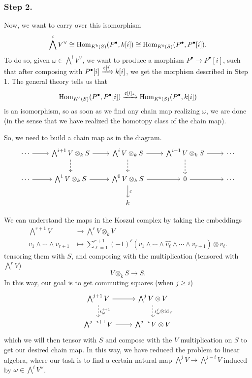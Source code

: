 \documentclass[12pt]{article}
\begin{document}
\subsubsection*{Step 2.}
Now, we want to carry over this isomorphism
\[\bigwedge^i V^\vee \cong \mathrm{Hom}_{K^b(S)}(P^\bullet, k[i]) \cong \mathrm{Hom}_{K^b(S)}(P^\bullet,P^\bullet[i]).\]
To do so, given $\omega \in \bigwedge^i V^\vee$, we want to produce a morphism $P^\bullet\to P^\bullet[i]$, such that after composing with $P^\bullet[i] \xrightarrow{\varepsilon[i]} k[i]$, we get the morphism described in Step 1. The general theory tells us that
\[\mathrm{Hom}_{K^b(S)}(P^\bullet,P^\bullet[i]) \xrightarrow{\varepsilon[i]_*} \mathrm{Hom}_{K^b(S)}(P^\bullet, k[i])\]
is an isomorphism, so as soon as we find any chain map realizing $\omega$, we are done (in the sense that we have realized the homotopy class of the chain map).

So, we need to build a chain map as in the diagram.
\begin{equation}\label{extend-to-koszul}
\begin{tikzcd}
    \cdots \rar & \bigwedge^{i+1} V \otimes_k S \rar \dar[dashed] & \bigwedge^i V \otimes_k S \rar \dar[dashed] & \bigwedge^{i-1} V \otimes_k S \rar \dar[dashed] & \cdots\\
    \cdots \rar & \bigwedge^1 V \otimes_k S \rar & \bigwedge^0 V \otimes_k S \rar \dar["\eps"] & 0 \rar & \cdots\\
    & & k & &
\end{tikzcd}
\end{equation}


We can understand the maps in the Koszul complex by taking the embeddings
\begin{align*}
    \bigwedge^{r+1} V &\longrightarrow \bigwedge^{r} V \otimes_k V\\
    v_1\wedge \cdots \wedge v_{r+1} &\longmapsto \sum_{\ell=1}^{r+1} (-1)^\ell (v_1 \wedge \cdots \wedge \hat{v_\ell} \wedge \cdots \wedge v_{r+1}) \otimes v_\ell.
\end{align*}
tensoring them with $S$, and composing with the multiplication (tensored with $\bigwedge^r V$)
\[V \otimes_k S \longrightarrow S.\]
In this way, our goal is to get commuting squares (when $j\geq i$)
\begin{equation}\label{koszul-boundary}
\begin{tikzcd}
    \bigwedge^{j+1} V \rar \dar[dashed, "\iota_\omega^{j+1}"] & \bigwedge^{j} V \otimes V \dar[dashed, "\iota_\omega^j \otimes \id_V"]\\
    \bigwedge^{j-i+1} V \rar &  \bigwedge^{j-i} V \otimes V
\end{tikzcd}
\end{equation}
which we will then tensor with $S$ and compose with the $V$ multiplication on $S$ to get our desired chain map. In this way, we have reduced the problem to linear algebra, where our task is to find a certain natural map $\bigwedge^{j} V \to \bigwedge^{j-i} V$ induced by $\omega \in \bigwedge^i V^\vee$.
\end{document}
